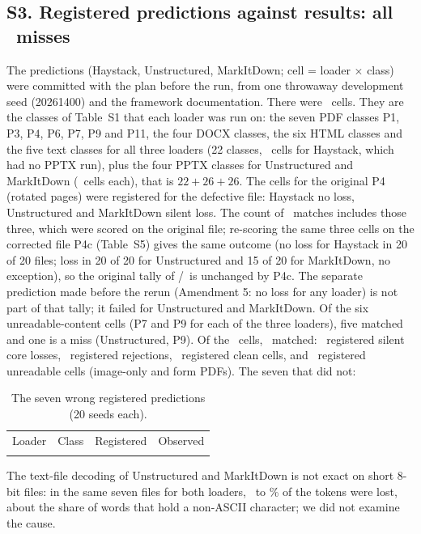 \subsection*{S3. Registered predictions against results: all \preregMiss\ misses}
The predictions (Haystack, Unstructured, MarkItDown; cell = loader $\times$ class) were committed with the plan before the run, from one throwaway development seed (20261400) and the framework documentation. There were \preregCells\ cells. They are the classes of Table~S1 that each loader was run on: the seven PDF classes P1, P3, P4, P6, P7, P9 and P11, the four DOCX classes, the six HTML classes and the five text classes for all three loaders (22 classes, \preregCellsHS\ cells for Haystack, which had no PPTX run), plus the four PPTX classes for Unstructured and MarkItDown (\preregCellsUN\ cells each), that is $22+26+26$. The cells for the original P4 (rotated pages) were registered for the defective file: Haystack no loss, Unstructured and MarkItDown silent loss. The count of \preregHit\ matches includes those three, which were scored on the original file; re-scoring the same three cells on the corrected file P4c (Table~S5) gives the same outcome (no loss for Haystack in 20 of 20 files; loss in 20 of 20 for Unstructured and 15 of 20 for MarkItDown, no exception), so the original tally of \preregHit/\preregCells\ is unchanged by P4c. The separate prediction made before the rerun (Amendment 5: no loss for any loader) is not part of that tally; it failed for Unstructured and MarkItDown. Of the six unreadable-content cells (P7 and P9 for each of the three loaders), five matched and one is a miss (Unstructured, P9). Of the \preregCells\ cells, \preregHit\ matched: \preregAHit\ registered silent core losses, \preregRaisedHit\ registered rejections, \preregBHit\ registered clean cells, and \preregUnreadHit\ registered unreadable cells (image-only and form PDFs). The seven that did not:
\begin{table}[H]
\caption{The seven wrong registered predictions (20 seeds each).\label{tab:prereg}}
\begin{ruledtabular}
\begin{tabular}{llll}
Loader & Class & Registered & Observed \\
\colrule

\end{tabular}
\end{ruledtabular}
\end{table}
The text-file decoding of Unstructured and MarkItDown is not exact on short 8-bit files: in the same seven files for both loaders, \eightBitLostLo\ to \eightBitLostHi\% of the tokens were lost, about the share of words that hold a non-ASCII character; we did not examine the cause.

